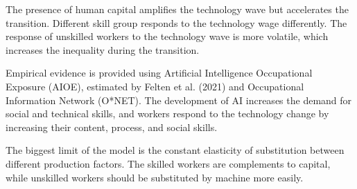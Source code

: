 \documentclass[12pt]{article}
\begin{document}
The presence of human capital amplifies the technology wave but accelerates the transition. Different skill group responds to the technology wage differently. The response of unskilled workers to the technology wave is more volatile, which increases the inequality during the transition. 

Empirical evidence is provided using Artificial Intelligence Occupational Exposure (AIOE), estimated by Felten et al. (2021) and Occupational Information Network (O*NET). The development of AI increases the demand for social and technical skills, and workers respond to the technology change by increasing their content, process, and social skills. 

The biggest limit of the model is the constant elasticity of substitution between different production factors. The skilled workers are complements to capital, while unskilled workers should be substituted by machine more easily. 


\clearpage


\clearpage
\end{document}
